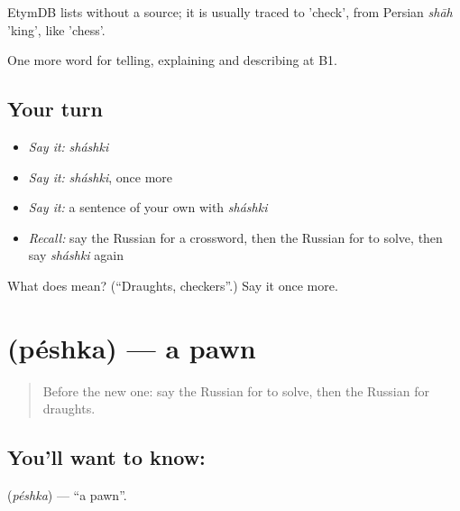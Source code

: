 \begin{cousinweb}
EtymDB lists \emph{} without a source; it is usually traced to \emph{} 'check', from Persian \emph{shāh} 'king', like \emph{} 'chess'.
\end{cousinweb}

\begin{grammarlens}[title={What you've built}]
One more word for telling, explaining and describing at B1.
\end{grammarlens}

\subsection*{Your turn}
\begin{itemize}
\raggedright
  \item \emph{Say it:} \emph{sháshki}
  \item \emph{Say it:} \emph{sháshki}, once more
  \item \emph{Say it:} a sentence of your own with \emph{sháshki}
  \item \emph{Recall:} say the Russian for a crossword, then the Russian for to solve, then say \emph{sháshki} again
\end{itemize}

\begin{tcolorbox}[breakable,colback=teal!4,colframe=teal!35!black,title={Before you move on}]
What does  mean? (\textquotedblleft{}Draughts, checkers\textquotedblright{}.) Say it once more.
\end{tcolorbox}
\section[\texorpdfstring{\ru{пешка} (péshka)}{пешка (péshka)}]{ (péshka) — a pawn}

\label{lesson:RU-C504-peshka}



\begin{quote}
Before the new one: say the Russian for to solve, then the Russian for draughts.
\end{quote}

\subsection*{You'll want to know: }
\textbf{} (\emph{péshka}) — \textquotedblleft{}a pawn\textquotedblright{}.

